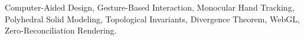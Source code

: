 \documentclass[10pt,journal,compsoc]{IEEEtran}
\begin{document}
{\begin{IEEEkeywords}
Computer-Aided Design, Gesture-Based Interaction, Monocular Hand Tracking, Polyhedral Solid Modeling, Topological Invariants, Divergence Theorem, WebGL, Zero-Reconciliation Rendering.
\end{IEEEkeywords}}

\maketitle
\IEEEdisplaynontitleabstractindextext
\IEEEpeerreviewmaketitle













\end{document}
